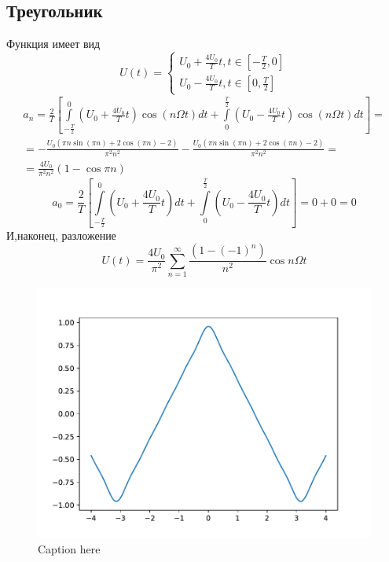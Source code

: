 \subsection{Треугольник}
Функция имеет вид 
\begin{equation}
	U(t)=\left\{
	\begin{aligned}
		U_0+\frac{4U_0}{T}t, t\in [-\frac{T}{2},0]\\
		U_0-\frac{4U_0}{T}t, t\in[0, \frac{T}{2}]
	\end{aligned}
	\right.
\end{equation}
\begin{gather}
	a_n=\frac{2}{T}\left[\int\limits^0_{-\frac{T}{2}}(U_0+\frac{4U_0}{T}t)\cos(n\Omega t)dt+\int\limits_0^{\frac{T}{2}}(U_0-\frac{4U_0}{T}t)\cos(n\Omega t)dt \right]=\\=
	-\frac{U_0 (\pi  n \sin (\pi  n)+2 \cos (\pi  n)-2)}{\pi ^2 n^2}-\frac{U_0 (\pi  n \sin (\pi  n)+2 \cos (\pi  n)-2)}{\pi ^2 n^2}=\\=
	\frac{4U_0}{\pi^2 n^2}(1-\cos{\pi n})
\end{gather}
\begin{equation}
	a_0=\frac{2}{T}\left[\int\limits_{-\frac{T}{2}}^0 (U_0+\frac{4U_0}{T}t)dt + \int\limits_0^{\frac{T}{2}} (U_0-\frac{4U_0}{T}t)dt \right]=0+0=0
\end{equation}
И,наконец, разложение
\begin{equation}
	U(t)=\frac{4U_0}{\pi^2}\sum_{n=1}^{\infty}\frac{(1-(-1)^n)}{n^2}\cos{n\Omega t}
\end{equation}
\begin{figure}[tb]
	\centering
	\includegraphics[]{plot/triangle}
	\caption{Caption here}
	\label{fig:figure1}
\end{figure}
